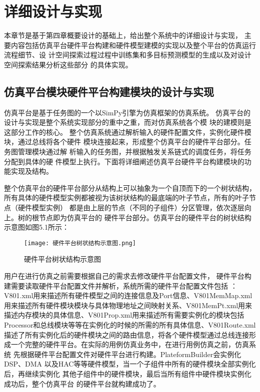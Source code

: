 
\chapter{详细设计与实现}
本章节是基于第四章概要设计的基础上，给出整个系统中的详细设计与实现，
主要内容包括仿真平台硬件平台构建和硬件模型建模的实现以及整个平台的仿真运行流程细节、设
计空间探索过程过程中训练集和多目标预测模型的生成以及对设计空间探索结果分析这些部分
的具体实现。

\section{仿真平台模块硬件平台构建模块的设计与实现}
仿真平台是基于任务图的一个以SimPy引擎为仿真框架的仿真系统\cite{36}。
仿真平台的设计与实现是整个系统实现部分的重中之重，而对仿真系统各个模
块的建模则是这部分工作的核心。
整个仿真系统通过解析输入的硬件配置文件，实例化硬件模块，通过总线将各个硬件
模块连接起来，形成整个仿真平台的硬件平台部分。任务图管理模块通过解
析输入的任务图，并根据触发关系链式的调度任务，将任务分配到具体的硬
件模型上执行。下面将详细阐述仿真平台硬件平台构建模块的功能实现及结构。

整个仿真平台的硬件平台部分从结构上可以抽象为一个自顶而下的一个树状结构，
所有具体的硬件模型实例都被视为该树状结构的最底端的叶子节点，所有的叶子节点（硬件模型实例）
都是由上层的节点（不同的子组件）分区管理，依次逐层向上。树的根节点即为仿真平台的
硬件平台部分。仿真平台的硬件平台的树状结构示意图如图5.1所示：

\begin{figure}
    \centering
    \texttt{[image: 硬件平台树状结构示意图.png]}
    \caption{硬件平台树状结构示意图}
    \label{fig:badge}
\end{figure}

用户在进行仿真之前需要根据自己的需求去修改硬件平台配置文件，
硬件平台构建需要读取硬件平台配置文件并解析，系统所需的硬件平台配置文件包括
：V801.xml用来描述所有硬件模型之间的连接信息及Port信息、V801MemMap.xml
用来描述所有硬件模块模块与具体物理地址之间映射关系、V801MemPt.xml用来
描述内存模块的具体信息、V801Prop.xml用来描述所有需要实例化的模块包括
Processor和总线模块等等在实例化的时候的所需的所有具体信息、V801Route.xml
描述了所有实例化后的硬件模块之间的路由信息，将各个硬件模型通过总线连接形
成一个完整的硬件平台。在实际的用例仿真业务中，在进行用例仿真之前，仿真系统
先根据硬件平台配置文件对硬件平台进行构建。PlateformBuilder会实例化DSP、DMA
以及HAC等等硬件模型，当一个子组件中所有的硬件模块全部实例化后，再继续实例化
其他子组件中的硬件模块，最后当所有组件中硬件模块实例化成功后，整个仿真平台
的硬件平台就构建成功了。

